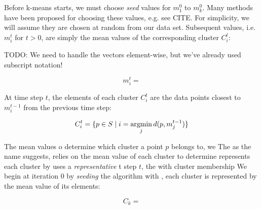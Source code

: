 Before k-means starts, we must choose \emph{seed} values for $m_1^0$ to $m_k^0$. Many methods have been proposed for choosing these values, e.g. see CITE. For simplicity, we will assume they are chosen at random from our data set. Subsequent values, i.e. $m_i^t$ for $t > 0$, are simply the mean values of the corresponding cluster $C_i^t$:

TODO: We need to handle the vectors element-wise, but we've already used subscript notation!

\begin{equation}
  m_i^t =
\end{equation}

At time step $t$, the elements of each cluster $C_i^t$ are the data points closest to $m_i^{t-1}$ from the previous time step:

\begin{equation}
  C_i^t = \{ p \in S \mid i = \argmin\limits_j d(p, m_j^{t-1}) \}
\end{equation}

The mean values o determine which cluster a point $p$ belongs to, we
The as the name suggests, relies on the mean value of each cluster to determine  represents each cluster by uses a \emph{representative} t step $t$, the with cluster membership  We begin at iteration 0 by \emph{seeding} the algorithm with , each cluster is represented by the mean value of its elements:

\begin{equation}
  C_k =
\end{equation}
